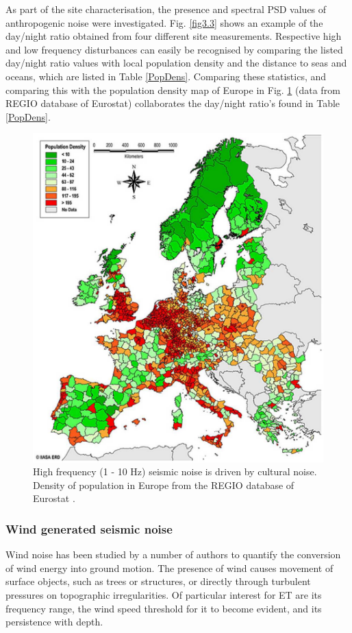 As part of the site characterisation, the presence and spectral PSD values of anthropogenic noise were investigated. Fig. \ref{fig3.3} shows an example of the day/night ratio obtained from four different site measurements. Respective high and low frequency disturbances can easily be recognised by comparing the listed day/night ratio values with local population density and the distance to seas and oceans, which are listed in Table \ref{PopDens}. Comparing these statistics, and comparing this with the population density map of Europe in Fig. \ref{fig3.4} (data from REGIO database of Eurostat) collaborates the day/night ratio's found in Table \ref{PopDens}. 
\begin{figure}[t!]
	\begin{center}
		 \includegraphics[width=12cm]{./Sec_SiteInfra/Figures/population.pdf}
		\caption{High frequency (1 - 10 Hz) seismic noise is driven by cultural noise. Density of population in Europe from the REGIO database of Eurostat \cite{eurostat}.}
	\label{fig3.4}
	\end{center}
\end{figure}

\FloatBarrier
\subsubsection*{Wind generated seismic noise}
Wind noise has been studied by a number of authors to quantify the conversion of wind energy into ground motion. The presence of wind causes movement of surface objects, such as trees or structures, or directly through turbulent pressures on topographic irregularities. Of particular interest for ET are its frequency range, the wind speed threshold for it to become evident, and its persistence with depth. 


